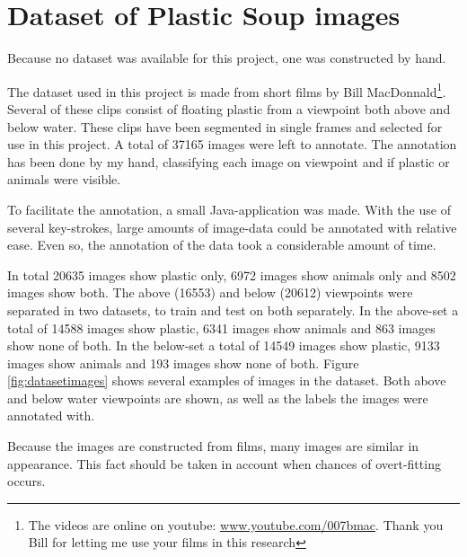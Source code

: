 \section{Dataset of Plastic Soup images}
\label{sec:Data}
Because no dataset was available for this project, one was constructed by hand.


The dataset used in this project is made from short films by Bill MacDonnald\footnote{The videos are online on youtube: \url{www.youtube.com/007bmac}. Thank you Bill for letting me use your films in this research}.
Several of these clips consist of floating plastic from a viewpoint both above and below water.
These clips have been segmented in single frames and selected for use in this project.
A total of 37165 images were left to annotate.
The annotation has been done by my hand, classifying each image on viewpoint and if plastic or animals were visible.

To facilitate the annotation, a small Java-application was made.
With the use of several key-strokes, large amounts of image-data could be annotated with relative ease.
Even so, the annotation of the data took a considerable amount of time.

In total 20635 images show plastic only, 6972 images show animals only and 8502 images show both.
The above (16553) and below (20612) viewpoints were separated in two datasets, to train and test on both separately. 
In the above-set a total of 14588 images show plastic, 6341 images show animals and 863 images show none of both. In the below-set a total of 14549 images show plastic, 9133 images show animals and 193 images show none of both.
Figure \ref{fig:datasetimages} shows several examples of images in the dataset.
Both above and below water viewpoints are shown, as well as the labels the images were annotated with.

Because the images are constructed from films, many images are similar in appearance.
This fact should be taken in account when chances of overt-fitting occurs.

